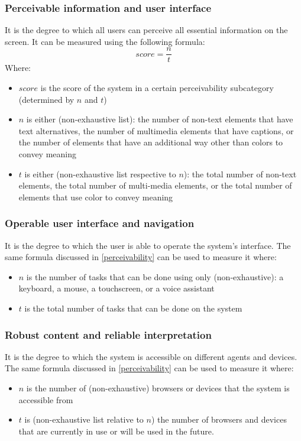 \documentclass[11pt,a4paper]{article}
\begin{document}
\subsubsection{\label{perceivability}Perceivable information and user interface}
It is the degree to which all users can perceive all essential information on the screen.
It can be measured using the following formula:
\[score = \frac{n}{t}\]
Where:
\begin{itemize}
    \item $score$ is the score of the system in a certain perceivability subcategory (determined by $n$ and $t$)
    \item $n$ is either (non-exhaustive list): the number of non-text elements that have text alternatives,
          the number of multimedia elements that have captions,
          or the number of elements that have an additional way other than colors to convey meaning
    \item $t$ is either (non-exhaustive list respective to $n$):
          the total number of non-text elements,
          the total number of multi-media elements,
          or the total number of elements that use color to convey meaning
\end{itemize}

\subsubsection{Operable user interface and navigation}
It is the degree to which the user is able to operate the system's interface.
The same formula discussed in \ref{perceivability} can be used to measure it where:
\begin{itemize}
    \item $n$ is the number of tasks that can be done using only (non-exhaustive):
          a keyboard, a mouse, a touchscreen, or a voice assistant
    \item $t$ is the total number of tasks that can be done on the system
\end{itemize}

\subsubsection{Robust content and reliable interpretation}
It is the degree to which the system is accessible on different agents and devices.
The same formula discussed in \ref{perceivability} can be used to measure it where:
\begin{itemize}
    \item $n$ is the number of (non-exhaustive) browsers or devices that the system is accessible from
    \item $t$ is (non-exhaustive list relative to $n$) the number of browsers and devices that are currently in use or
          will be used in the future.
\end{itemize}
\end{document}
